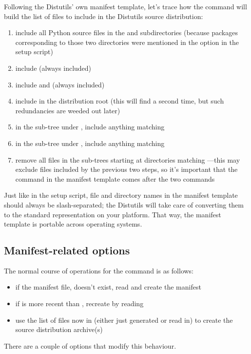 \documentclass{howto}
\begin{document}
Following the Distutils' own manifest template, let's trace how the
 command will build the list of files to include in the
Distutils source distribution:
\begin{enumerate}
\item include all Python source files in the  and
   subdirectories (because packages
  corresponding to those two directories were mentioned in the
   option in the setup script)
\item include  (always included)
\item include  and  (always included)
\item include  in the distribution root (this will find
   a second time, but such redundancies are weeded out
  later)
\item in the sub-tree under , include anything matching
\item in the sub-tree under , include anything matching
\item remove all files in the sub-trees starting at directories matching
  ---this may exclude files included by the
  previous two steps, so it's important that the  command in
  the manifest template comes after the two 
  commands
\end{enumerate}

Just like in the setup script, file and directory names in the manifest
template should always be slash-separated; the Distutils will take care
of converting them to the standard representation on your platform.
That way, the manifest template is portable across operating systems.


\subsection{Manifest-related options}
\label{sec:manifest-options}

The normal course of operations for the  command is as
follows:
\begin{itemize}
\item if the manifest file,  doesn't exist, read
   and create the manifest
\item if  is more recent than ,
  recreate  by reading 
\item use the list of files now in  (either just
  generated or read in) to create the source distribution archive(s)
\end{itemize}
There are a couple of options that modify this behaviour.
\end{document}
